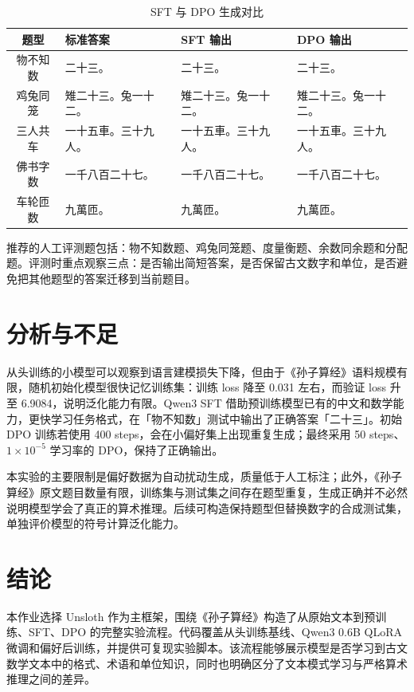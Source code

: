 \documentclass[a4paper,10pt,twocolumn]{article}
\begin{document}
\begin{table}[H]
\centering
\scriptsize
\caption{SFT 与 DPO 生成对比}
\begin{tabular}{c|p{}|p{}|p{}}
\toprule
题型 & 标准答案 & SFT 输出 & DPO 输出 \\
\midrule
物不知数 & 二十三。 & 二十三。 & 二十三。 \\
鸡兔同笼 & 雉二十三。兔一十二。 & 雉二十三。兔一十二。 & 雉二十三。兔一十二。 \\
三人共车 & 一十五車。三十九人。 & 一十五車。三十九人。 & 一十五車。三十九人。 \\
佛书字数 & 一千八百二十七。 & 一千八百二十七。 & 一千八百二十七。 \\
车轮匝数 & 九萬匝。 & 九萬匝。 & 九萬匝。 \\
\bottomrule
\end{tabular}
\end{table}

推荐的人工评测题包括：物不知数题、鸡兔同笼题、度量衡题、余数同余题和分配题。评测时重点观察三点：是否输出简短答案，是否保留古文数字和单位，是否避免把其他题型的答案迁移到当前题目。

\section{分析与不足}
从头训练的小模型可以观察到语言建模损失下降，但由于《孙子算经》语料规模有限，随机初始化模型很快记忆训练集：训练 loss 降至 0.031 左右，而验证 loss 升至 6.9084，说明泛化能力有限。Qwen3 SFT 借助预训练模型已有的中文和数学能力，更快学习任务格式，在「物不知数」测试中输出了正确答案「二十三」。初始 DPO 训练若使用 400 steps，会在小偏好集上出现重复生成；最终采用 50 steps、$1\times10^{-5}$ 学习率的 DPO，保持了正确输出。

本实验的主要限制是偏好数据为自动扰动生成，质量低于人工标注；此外，《孙子算经》原文题目数量有限，训练集与测试集之间存在题型重复，生成正确并不必然说明模型学会了真正的算术推理。后续可构造保持题型但替换数字的合成测试集，单独评价模型的符号计算泛化能力。

\section{结论}
本作业选择 Unsloth 作为主框架，围绕《孙子算经》构造了从原始文本到预训练、SFT、DPO 的完整实验流程。代码覆盖从头训练基线、Qwen3 0.6B QLoRA 微调和偏好后训练，并提供可复现实验脚本。该流程能够展示模型是否学习到古文数学文本中的格式、术语和单位知识，同时也明确区分了文本模式学习与严格算术推理之间的差异。
\end{document}
